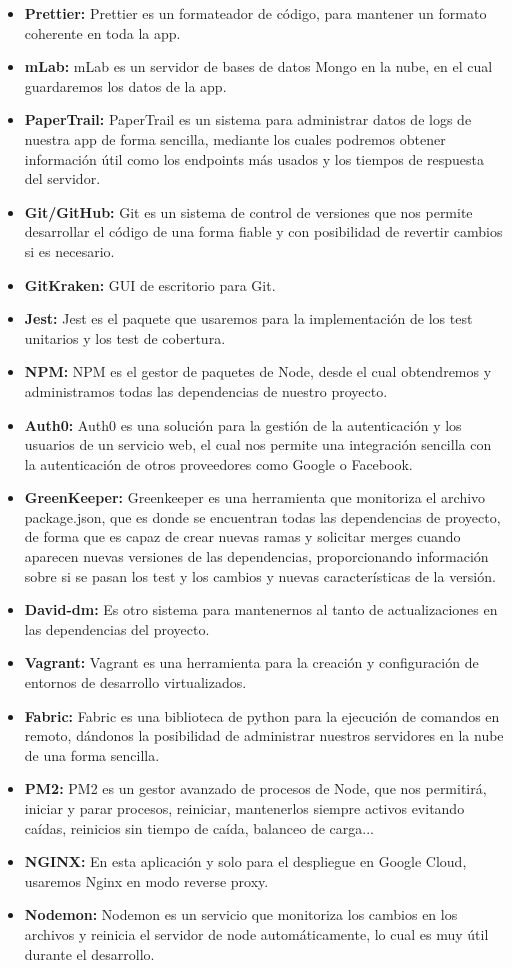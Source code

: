 \begin{itemize}
  \item \textbf{Prettier:} Prettier es un formateador de código, para mantener un formato coherente en toda la app. 
  \item \textbf{mLab:} mLab es un servidor de bases de datos Mongo en la nube, en el cual guardaremos los datos de la app.
  \item \textbf{PaperTrail:} PaperTrail es un sistema para administrar datos de logs de nuestra app de forma sencilla, mediante los cuales podremos obtener información útil como los endpoints más usados y los tiempos de respuesta del servidor.
  \item \textbf{Git/GitHub:} Git es un sistema de control de versiones que nos permite desarrollar el código de una forma fiable y con posibilidad de revertir cambios si es necesario.
  \item \textbf{GitKraken:} GUI de escritorio para Git.
  \item \textbf{Jest:} Jest es el paquete que usaremos para la implementación de los test unitarios y los test de cobertura.
  \item \textbf{NPM:} NPM es el gestor de paquetes de Node, desde el cual obtendremos y administramos todas las dependencias de nuestro proyecto.
  \item \textbf{Auth0:} Auth0 es una solución para la gestión de la autenticación y los usuarios de un servicio web, el cual nos permite una integración sencilla con la autenticación de otros proveedores como Google o Facebook.
  \item \textbf{GreenKeeper:} Greenkeeper es una herramienta que monitoriza el archivo package.json, que es donde se encuentran todas las dependencias de proyecto, de forma que es capaz de crear nuevas ramas y solicitar merges cuando aparecen nuevas versiones de las dependencias, proporcionando información sobre si se pasan los test y los cambios y nuevas características de la versión.
  \item \textbf{David-dm:} Es otro sistema para mantenernos al tanto de actualizaciones en las dependencias del proyecto.
  \item \textbf{Vagrant:} Vagrant es una herramienta para la creación y configuración de entornos de desarrollo virtualizados.
  \item \textbf{Fabric: }Fabric es una biblioteca de python para la ejecución de comandos en remoto, dándonos la posibilidad de administrar nuestros servidores en la nube de una forma sencilla.
  \item \textbf{PM2:} PM2 es un gestor avanzado de procesos de Node, que nos permitirá, iniciar y parar procesos, reiniciar, mantenerlos siempre activos evitando caídas, reinicios sin tiempo de caída, balanceo de carga...
  \item \textbf{NGINX:} En esta aplicación y solo para el despliegue en Google Cloud, usaremos Nginx en modo reverse proxy.
  \item \textbf{Nodemon:} Nodemon es un servicio que monitoriza los cambios en los archivos y reinicia el servidor de node automáticamente, lo cual es muy útil durante el desarrollo.

\end{itemize}
